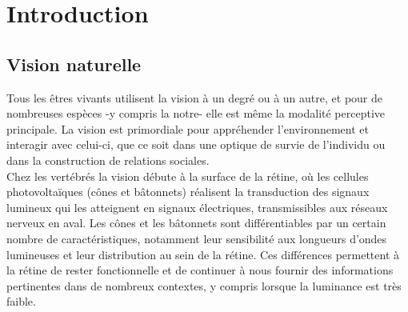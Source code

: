 
\chapter{Introduction} %
\label{Introduction} %


\newcommand{\keyword}[1]{\textbf{#1}}
\newcommand{\tabhead}[1]{\textbf{#1}}
\newcommand{\code}[1]{\texttt{#1}}
\newcommand{\file}[1]{\texttt{\bfseries#1}}
\newcommand{\option}[1]{\texttt{\itshape#1}}


\section{Vision naturelle}
Tous  les êtres vivants utilisent la vision à un degré ou à un autre, et pour de nombreuses espèces -y compris la notre- elle est même la modalité perceptive principale. La vision est primordiale pour appréhender l'environnement et interagir avec celui-ci, que ce soit dans une optique de survie de l'individu ou dans la construction de relations sociales.\autocite{Werner2014}\\

Chez les vertébrés la vision débute à la surface de la rétine, où les cellules photovoltaïques (cônes et bâtonnets) réalisent la transduction des signaux lumineux qui les atteignent en signaux électriques, transmissibles aux réseaux nerveux en aval.
Les cônes et les bâtonnets sont différentiables par un certain nombre de caractéristiques, notamment leur sensibilité aux longueurs d'ondes lumineuses et leur distribution au sein de la rétine. Ces différences permettent à la rétine de rester fonctionnelle et de continuer à nous fournir des informations pertinentes dans de nombreux contextes, y compris lorsque la luminance est très faible.\autocite{Werner2014}\\

